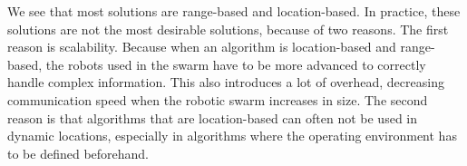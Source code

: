 We see that most solutions are range-based and location-based. 
In practice, these solutions are not the most desirable solutions, because of two reasons. 
The first reason is scalability. 
Because when an algorithm is location-based and range-based, the robots used in the swarm have to be more advanced to correctly handle complex information. 
This also introduces a lot of overhead, decreasing communication speed when the robotic swarm increases in size. 
The second reason is that algorithms that are location-based can often not be used in dynamic locations, especially in algorithms where the operating environment has to be defined beforehand. 
